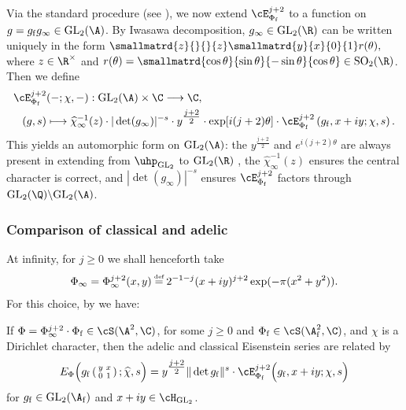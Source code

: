 \documentclass[10pt,reqno,a4paper]{amsart}
\newcommand{\stbt}[4]{\left(\begin{smallmatrix}#1 & #2\\#3&#4\end{smallmatrix}\right)}
\newcommand{\Phif}{{\Phi\subf}}
\newcommand{\chihat}{\widehat{\chi}}
\newcommand{\subf}{_{\mathrm{f}}}
\newcommand{\GL}{\mathrm{GL}}
\begin{document}
Via the standard procedure (see \cite[\S I]{Wei71}), we now extend $\cE_{\Phif}^{j+2}$ to a function on $g = g\subf g_\infty \in \GL_2(\A)$. By Iwasawa decomposition, $g_\infty \in \GL_2(\R)$ can be written uniquely in the form $\smallmatrd{z}{}{}{z}\smallmatrd{y}{x}{0}{1}r(\theta),$ where $z \in \R^\times$ and $r(\theta) = \smallmatrd{\cos \theta}{\sin \theta}{-\sin \theta}{\cos \theta} \in \mathrm{SO}_2(\R)$. Then we define
\begin{align}\label{eq:classical on GL2(A)}
\cE_{\Phif}^{j+2}&(-;\chi,-) : \GL_2(\A) \times \C \longrightarrow \C,\\
(g, s) &\longmapsto \chihat_\infty^{-1}(z) \cdot |\det(g_\infty)|^{-s}\cdot y^{\tfrac{j+2}{2}} \cdot \mathrm{exp}[{i(j+2)\theta}] \cdot \cE_{\Phif}^{j+2}\left(g\subf, x+iy; \chi, s\right).\notag
\end{align}
This yields an automorphic form on $\GL_2(\A)$: the $y^{\tfrac{j+2}{2}}$ and $e^{i(j+2)\theta}$ are always present in extending from $\uhp_{\GL_2}$ to $\GL_2(\R)$ \cite{Wei71}, the $\chihat_\infty^{-1}(z)$ ensures the central character is correct, and $|\det(g_\infty)|^{-s}$ ensures $\cE_{\Phif}^{j+2}$ factors through $\GL_2(\Q)\backslash \GL_2(\A)$.


\subsubsection{Comparison of classical and adelic}\label{sec:comparison}
At infinity, for $j \geq 0$ we shall henceforth take
\begin{equation}\label{eq:schwartz infinity}
\Phi_\infty = \Phi_\infty^{j+2}(x, y) \defeq 2^{-1-j} (x + iy)^{j+2} \exp(-\pi(x^2 + y^2)).
\end{equation}
For this choice, by \cite[Prop.\ 10.1]{LPSZ19} we have:

\begin{proposition}\label{prop:compatibility}
If $\Phi = \Phi_\infty^{j+2} \cdot \Phif \in \cS(\A^2, \C)$, for some $j \ge 0$ and $\Phi_{\mathrm{f}} \in \cS(\A\subf^2, \C)$, and $\chi$ is a Dirichlet character, then the adelic and classical Eisenstein series are related by
\[
E_{\Phi}\Big(g\subf \stbt y x 0 1; \chihat, s\Big) = y^{\tfrac{j+2}{2}} \|\det g\subf\|^{s} \cdot \cE^{j+2}_{\Phi_{\mathrm{f}}}\Big(g\subf, x + iy; \chi, s\Big)
\]
for $g\subf \in \GL_2(\A\subf)$ and $x + iy \in \cH_{\GL_2}$.
\end{proposition}

\end{document}
